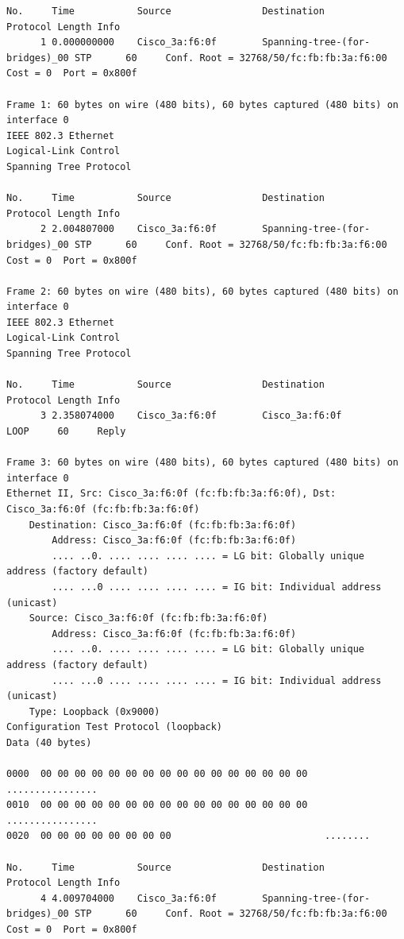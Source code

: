 \documentclass[a4paper,11pt]{article}
\begin{document}
\begin{lstlisting}
No.     Time           Source                Destination           Protocol Length Info
      1 0.000000000    Cisco_3a:f6:0f        Spanning-tree-(for-bridges)_00 STP      60     Conf. Root = 32768/50/fc:fb:fb:3a:f6:00  Cost = 0  Port = 0x800f

Frame 1: 60 bytes on wire (480 bits), 60 bytes captured (480 bits) on interface 0
IEEE 802.3 Ethernet 
Logical-Link Control
Spanning Tree Protocol

No.     Time           Source                Destination           Protocol Length Info
      2 2.004807000    Cisco_3a:f6:0f        Spanning-tree-(for-bridges)_00 STP      60     Conf. Root = 32768/50/fc:fb:fb:3a:f6:00  Cost = 0  Port = 0x800f

Frame 2: 60 bytes on wire (480 bits), 60 bytes captured (480 bits) on interface 0
IEEE 802.3 Ethernet 
Logical-Link Control
Spanning Tree Protocol

No.     Time           Source                Destination           Protocol Length Info
      3 2.358074000    Cisco_3a:f6:0f        Cisco_3a:f6:0f        LOOP     60     Reply

Frame 3: 60 bytes on wire (480 bits), 60 bytes captured (480 bits) on interface 0
Ethernet II, Src: Cisco_3a:f6:0f (fc:fb:fb:3a:f6:0f), Dst: Cisco_3a:f6:0f (fc:fb:fb:3a:f6:0f)
    Destination: Cisco_3a:f6:0f (fc:fb:fb:3a:f6:0f)
        Address: Cisco_3a:f6:0f (fc:fb:fb:3a:f6:0f)
        .... ..0. .... .... .... .... = LG bit: Globally unique address (factory default)
        .... ...0 .... .... .... .... = IG bit: Individual address (unicast)
    Source: Cisco_3a:f6:0f (fc:fb:fb:3a:f6:0f)
        Address: Cisco_3a:f6:0f (fc:fb:fb:3a:f6:0f)
        .... ..0. .... .... .... .... = LG bit: Globally unique address (factory default)
        .... ...0 .... .... .... .... = IG bit: Individual address (unicast)
    Type: Loopback (0x9000)
Configuration Test Protocol (loopback)
Data (40 bytes)

0000  00 00 00 00 00 00 00 00 00 00 00 00 00 00 00 00   ................
0010  00 00 00 00 00 00 00 00 00 00 00 00 00 00 00 00   ................
0020  00 00 00 00 00 00 00 00                           ........

No.     Time           Source                Destination           Protocol Length Info
      4 4.009704000    Cisco_3a:f6:0f        Spanning-tree-(for-bridges)_00 STP      60     Conf. Root = 32768/50/fc:fb:fb:3a:f6:00  Cost = 0  Port = 0x800f


\end{lstlisting}
\end{document}
